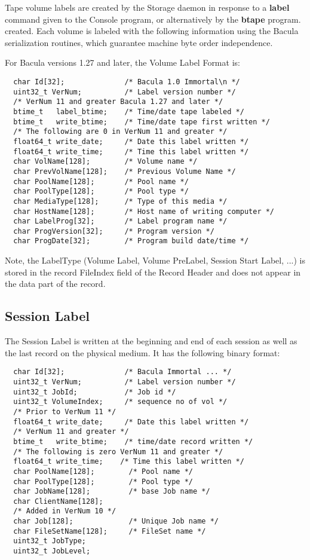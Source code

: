 Tape volume labels are created by the Storage daemon in response to a {\bf
label} command given to the Console program, or alternatively by the {\bf
btape} program. created. Each volume is labeled with the following information
using the Bacula serialization routines, which guarantee machine byte order
independence. 

For Bacula versions 1.27 and later, the Volume Label Format is: 

\footnotesize
\begin{verbatim}
  char Id[32];              /* Bacula 1.0 Immortal\n */
  uint32_t VerNum;          /* Label version number */
  /* VerNum 11 and greater Bacula 1.27 and later */
  btime_t   label_btime;    /* Time/date tape labeled */
  btime_t   write_btime;    /* Time/date tape first written */
  /* The following are 0 in VerNum 11 and greater */
  float64_t write_date;     /* Date this label written */
  float64_t write_time;     /* Time this label written */
  char VolName[128];        /* Volume name */
  char PrevVolName[128];    /* Previous Volume Name */
  char PoolName[128];       /* Pool name */
  char PoolType[128];       /* Pool type */
  char MediaType[128];      /* Type of this media */
  char HostName[128];       /* Host name of writing computer */
  char LabelProg[32];       /* Label program name */
  char ProgVersion[32];     /* Program version */
  char ProgDate[32];        /* Program build date/time */
\end{verbatim}
\normalsize

Note, the LabelType (Volume Label, Volume PreLabel, Session Start Label, ...)
is stored in the record FileIndex field of the Record Header and does not
appear in the data part of the record. 

\subsection*{Session Label}

The Session Label is written at the beginning and end of each session as well
as the last record on the physical medium. It has the following binary format:


\footnotesize
\begin{verbatim}
  char Id[32];              /* Bacula Immortal ... */
  uint32_t VerNum;          /* Label version number */
  uint32_t JobId;           /* Job id */
  uint32_t VolumeIndex;     /* sequence no of vol */
  /* Prior to VerNum 11 */
  float64_t write_date;     /* Date this label written */
  /* VerNum 11 and greater */
  btime_t   write_btime;    /* time/date record written */
  /* The following is zero VerNum 11 and greater */
  float64_t write_time;    /* Time this label written */
  char PoolName[128];        /* Pool name */
  char PoolType[128];        /* Pool type */
  char JobName[128];         /* base Job name */
  char ClientName[128];
  /* Added in VerNum 10 */
  char Job[128];             /* Unique Job name */
  char FileSetName[128];     /* FileSet name */
  uint32_t JobType;
  uint32_t JobLevel;
\end{verbatim}
\normalsize

